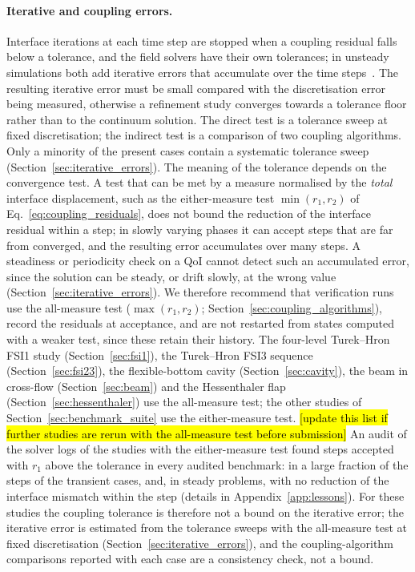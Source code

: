 \paragraph{Iterative and coupling errors.}
Interface iterations at each time step are stopped when a coupling residual falls below a tolerance, and the field solvers have their own tolerances; in unsteady simulations both add iterative errors that accumulate over the time steps~\citep{Eca2019}.
The resulting iterative error must be small compared with the discretisation error being measured, otherwise a refinement study converges towards a tolerance floor rather than to the continuum solution.
The direct test is a tolerance sweep at fixed discretisation; the indirect test is a comparison of two coupling algorithms.
Only a minority of the present cases contain a systematic tolerance sweep (Section~\ref{sec:iterative_errors}).
The meaning of the tolerance depends on the convergence test.
A test that can be met by a measure normalised by the \emph{total} interface displacement, such as the either-measure test $\min(r_1, r_2)$ of Eq.~\eqref{eq:coupling_residuals}, does not bound the reduction of the interface residual within a step; in slowly varying phases it can accept steps that are far from converged, and the resulting error accumulates over many steps.
A steadiness or periodicity check on a QoI cannot detect such an accumulated error, since the solution can be steady, or drift slowly, at the wrong value (Section~\ref{sec:iterative_errors}).
We therefore recommend that verification runs use the all-measure test ($\max(r_1, r_2)$; Section~\ref{sec:coupling_algorithms}), record the residuals at acceptance, and are not restarted from states computed with a weaker test, since these retain their history.
The four-level Turek--Hron FSI1 study (Section~\ref{sec:fsi1}), the Turek--Hron FSI3 sequence (Section~\ref{sec:fsi23}), the flexible-bottom cavity (Section~\ref{sec:cavity}), the beam in cross-flow (Section~\ref{sec:beam}) and the Hessenthaler flap (Section~\ref{sec:hessenthaler}) use the all-measure test; the other studies of Section~\ref{sec:benchmark_suite} use the either-measure test. \hl{[update this list if further studies are rerun with the all-measure test before submission]}
An audit of the solver logs of the studies with the either-measure test found steps accepted with $r_1$ above the tolerance in every audited benchmark: in a large fraction of the steps of the transient cases, and, in steady problems, with no reduction of the interface mismatch within the step (details in Appendix~\ref{app:lessons}).
For these studies the coupling tolerance is therefore not a bound on the iterative error; the iterative error is estimated from the tolerance sweeps with the all-measure test at fixed discretisation (Section~\ref{sec:iterative_errors}), and the coupling-algorithm comparisons reported with each case are a consistency check, not a bound.

